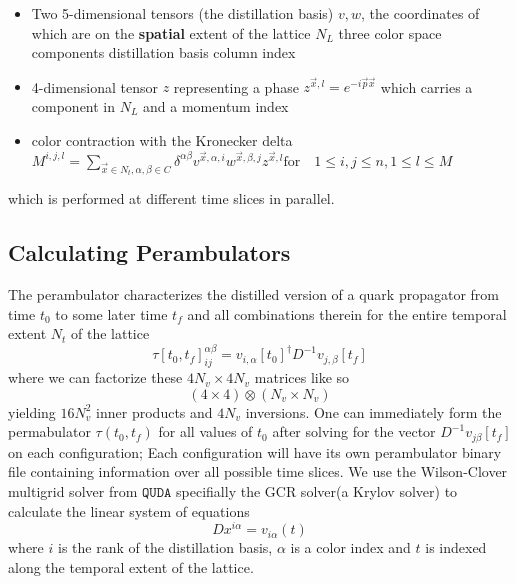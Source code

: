 \begin{itemize}
  \item Two 5-dimensional tensors (the distillation basis) $v,w$, the coordinates of which are on the \textbf{spatial} extent of the lattice $N_L$
  \subitem three color space components 
  \subitem distillation basis column index 
  \item  4-dimensional tensor $z$ representing a phase $z^{\vec{x},l} = e^{-i\vec{p}\vec{x}}$ which carries a component in $N_L$ and a momentum index
  \item color contraction with the Kronecker delta 
  \subitem $ M^{i,j,l} = \sum_{\vec{x}\in N_t,\alpha,\beta \in C}^{} \delta^{\alpha\beta} v^{\vec{x},\alpha,i}w^{\vec{x},\beta,j} z^{\vec{x},l} \text{for} \quad 1\leq i,j \leq n, 1\leq l \leq M$ 
\end{itemize}
which is performed at different time slices in parallel. 

\subsection{Calculating Perambulators}
The perambulator characterizes the distilled version of a quark propagator from time $t_0$ to some later time $t_f$ and all combinations therein for the entire temporal extent $N_t$ of the lattice \cite{peardon_novel_2009}
\begin{equation}
  \tau[t_0,t_f]_{ij}^{\alpha\beta} = v_{i,\alpha}[t_0]^{\dagger} D^{-1}v_{j,\beta}[t_f]
\end{equation} where we can factorize these $4N_v \times 4N_v$ matrices like so 
\begin{equation}
  (4 \times 4) \otimes (N_v \times N_v)
\end{equation} yielding $16N_v^2$ inner products and $4N_v$ inversions. One can immediately form the permabulator $\tau(t_0,t_f)$ for all values of $t_0$ after solving for the vector $D^{-1}v_{j\beta}[t_f]$ on each configuration; Each configuration will have its own perambulator binary file containing information over all possible time slices. We use the Wilson-Clover multigrid solver from $\texttt{QUDA}$ \cite{quda} specifially the GCR solver(a Krylov solver) to calculate the linear system of equations 
\begin{equation}
  Dx^{i\alpha} = v_{i\alpha}(t)
\end{equation} where $i$ is the rank of the distillation basis, $\alpha$ is a color index  and $t$ is indexed along the temporal extent of the lattice. 


